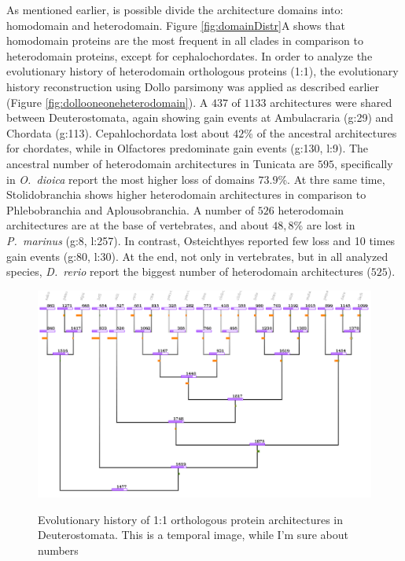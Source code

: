 \documentclass[11pt]{article}
\newcommand{\TODO}[1]{\begingroup\color{red}#1\endgroup}
\begin{document}
As mentioned earlier, is possible divide the architecture domains into: homodomain 
and heterodomain. Figure \ref{fig:domainDistr}A shows that homodomain proteins 
are the most frequent in all clades in comparison to heterodomain proteins, 
except for cephalochordates. In order to analyze the evolutionary history of 
heterodomain orthologous proteins (1:1), the evolutionary history reconstruction 
using Dollo parsimony was applied as described earlier (Figure \ref{fig:dollooneoneheterodomain}). A $437$ of $1133$ architectures were shared 
between Deuterostomata, again showing gain events at Ambulacraria (g:29) and 
Chordata (g:113). Cepahlochordata lost about $42$\% of the ancestral architectures 
for chordates, while in Olfactores predominate gain events (g:130, l:9). The 
ancestral number of heterodomain architectures in Tunicata are $595$, specifically 
in \textit{O.\ dioica} report the most higher loss of domains $73.9$\%. 
At thre same time, Stolidobranchia shows higher heterodomain architectures in 
comparison to Phlebobranchia and Aplousobranchia. A number of $526$ heterodomain
 architectures are at the base of vertebrates, and about $48,8$\% are lost in 
 \textsl{P.\ marinus} (g:8, l:257). In contrast, Osteichthyes reported few loss and 
 10 times gain events (g:80, l:30). At the end, not only in vertebrates, but in all 
analyzed species, \textit{D.\ rerio} report the biggest number of heterodomain 
architectures ($525$).

\begin{figure}[ht!]
\centering
\includegraphics[scale=0.53]{figures/provisionalDollo} \\
\caption{Evolutionary history of 1:1 orthologous protein architectures in 
Deuterostomata. \TODO{This is a temporal image, while I'm sure about numbers}}
\label{fig:dollooneone}
\end{figure}
\end{document}
